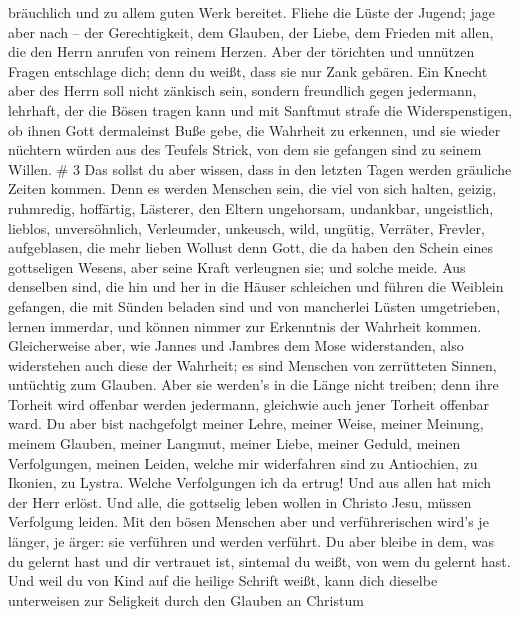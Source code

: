 bräuchlich und zu allem guten Werk bereitet.  Fliehe die
Lüste der Jugend; jage aber nach -- der Gerechtigkeit, dem Glauben, der
Liebe, dem Frieden mit allen, die den Herrn anrufen von reinem Herzen.
 Aber der törichten und unnützen Fragen entschlage dich;
denn du weißt, dass sie nur Zank gebären.  Ein Knecht aber
des Herrn soll nicht zänkisch sein, sondern freundlich gegen jedermann,
lehrhaft, der die Bösen tragen kann  und mit Sanftmut
strafe die Widerspenstigen, ob ihnen Gott dermaleinst Buße gebe, die
Wahrheit zu erkennen,  und sie wieder nüchtern würden aus
des Teufels Strick, von dem sie gefangen sind zu seinem Willen. \# 3
 Das sollst du aber wissen, dass in den letzten Tagen werden
gräuliche Zeiten kommen.  Denn es werden Menschen sein, die
viel von sich halten, geizig, ruhmredig, hoffärtig, Lästerer, den Eltern
ungehorsam, undankbar, ungeistlich,  lieblos, unversöhnlich,
Verleumder, unkeusch, wild, ungütig,  Verräter, Frevler,
aufgeblasen, die mehr lieben Wollust denn Gott,  die da
haben den Schein eines gottseligen Wesens, aber seine Kraft verleugnen
sie; und solche meide.  Aus denselben sind, die hin und her
in die Häuser schleichen und führen die Weiblein gefangen, die mit
Sünden beladen sind und von mancherlei Lüsten umgetrieben, 
lernen immerdar, und können nimmer zur Erkenntnis der Wahrheit kommen.
 Gleicherweise aber, wie Jannes und Jambres dem Mose
widerstanden, also widerstehen auch diese der Wahrheit; es sind Menschen
von zerrütteten Sinnen, untüchtig zum Glauben.  Aber sie
werden's in die Länge nicht treiben; denn ihre Torheit wird offenbar
werden jedermann, gleichwie auch jener Torheit offenbar ward.
 Du aber bist nachgefolgt meiner Lehre, meiner Weise,
meiner Meinung, meinem Glauben, meiner Langmut, meiner Liebe, meiner
Geduld,  meinen Verfolgungen, meinen Leiden, welche mir
widerfahren sind zu Antiochien, zu Ikonien, zu Lystra. Welche
Verfolgungen ich da ertrug! Und aus allen hat mich der Herr erlöst.
 Und alle, die gottselig leben wollen in Christo Jesu,
müssen Verfolgung leiden.  Mit den bösen Menschen aber und
verführerischen wird's je länger, je ärger: sie verführen und werden
verführt.  Du aber bleibe in dem, was du gelernt hast und
dir vertrauet ist, sintemal du weißt, von wem du gelernt hast.
 Und weil du von Kind auf die heilige Schrift weißt, kann
dich dieselbe unterweisen zur Seligkeit durch den Glauben an Christum
